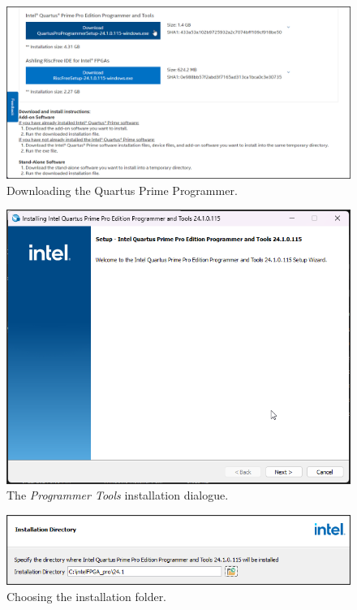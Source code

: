 \documentclass[11pt, twoside, pdftex]{article}
\begin{document}
\begin{enumerate}
\begin{figure}[H]
    \begin{center}
        \includegraphics[width=.9\linewidth]{figures/down2.png}
        \caption{Downloading the Quartus Prime Programmer.}
        \label{fig:down2}
    \end{center}
\end{figure}

\begin{figure}[h]
    \begin{center}
        \includegraphics[scale=0.66]{figures/exe1.png}
        \caption{The {\it Programmer Tools} installation dialogue.}
        \label{fig:exe1}
    \end{center}
\end{figure}

\begin{figure}[h]
    \begin{center}
        \includegraphics[scale=0.66]{figures/exe2.png}
        \caption{Choosing the installation folder.}
        \label{fig:exe2}
    \end{center}
\end{figure}


\end{enumerate}
\end{document}
